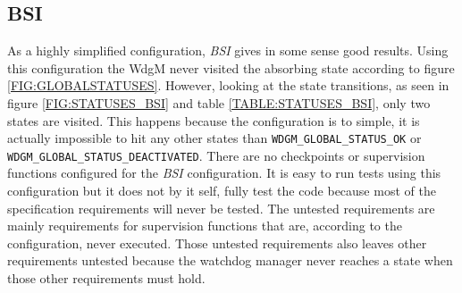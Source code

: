\subsection{BSI}
As a highly simplified configuration, \emph{BSI} gives in some sense
good results.  Using this configuration the WdgM never visited the
absorbing state according to figure \ref{FIG:GLOBALSTATUSES}. However,
looking at the state transitions, as seen in figure
\ref{FIG:STATUSES_BSI} and table \ref{TABLE:STATUSES_BSI}, only two
states are visited. This happens because the configuration is to
simple, it is actually impossible to hit any other states than
\lstinline!WDGM_GLOBAL_STATUS_OK! or
\lstinline!WDGM_GLOBAL_STATUS_DEACTIVATED!. There are no checkpoints
or supervision functions configured for the \emph{BSI} configuration.
It is easy to run tests using this configuration but it does not by it
self, fully test the code because most of the specification
requirements will never be tested. The untested requirements are
mainly requirements for supervision functions that are, according to
the configuration, never executed. Those untested requirements also
leaves other requirements untested because the watchdog manager never
reaches a state when those other requirements must hold.


